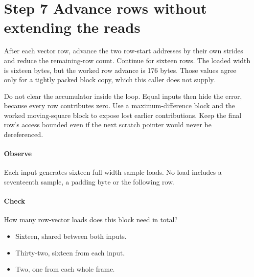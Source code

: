 \section{Step 7 Advance rows without extending the reads}\label{h263-sad-s07}
After each vector row, advance the two row-start addresses by their own strides
and reduce the remaining-row count. Continue for sixteen rows. The loaded width
is sixteen bytes, but the worked row advance is 176 bytes. Those values agree
only for a tightly packed block copy, which this caller does not supply.

Do not clear the accumulator inside the loop. Equal inputs then hide the error,
because every row contributes zero. Use a maximum-difference block and the worked
moving-square block to expose lost earlier contributions. Keep the final row's
access bounded even if the next scratch pointer would never be dereferenced.

\paragraph{Observe} Each input generates sixteen full-width sample loads. No
load includes a seventeenth sample, a padding byte or the following row.
\paragraph{Check} How many row-vector loads does this block need in total?
\begin{itemize}
  \item[A.] Sixteen, shared between both inputs.
  \item[B.] Thirty-two, sixteen from each input.
  \item[C.] Two, one from each whole frame.
\end{itemize}
